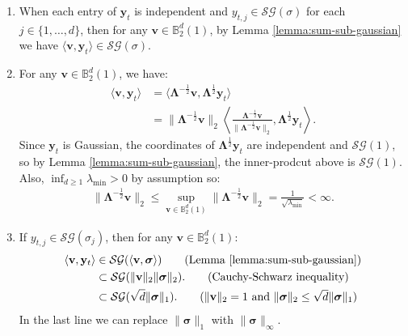 \begin{enumerate}[label=\roman*)]
    \item When each entry of $\mathbf{y}_t$ is independent and $y_{t,j} \in \mathcal{SG}(\sigma)$ for each $j \in \{1, \ldots, d\}$, then for any $\mathbf{v} \in \mathbb{B}^d_2(1)$, by Lemma \ref{lemma:sum-sub-gaussian} we have $\langle \mathbf{v}, \mathbf{y}_t \rangle \in \mathcal{SG}(\sigma)$.
    \item For any $\mathbf{v} \in \mathbb{B}^d_2(1)$, we have:
    \begin{align*}
        \langle \mathbf{v}, \mathbf{y}_t \rangle &= \langle \boldsymbol{\Lambda}^{-\frac{1}{2}}\mathbf{v}, \boldsymbol{\Lambda}^{\frac{1}{2}}\mathbf{y}_t \rangle \\
        &= \lVert\boldsymbol{\Lambda}^{-\frac{1}{2}}\mathbf{v}\rVert_{2} \left\langle \frac{\boldsymbol{\Lambda}^{-\frac{1}{2}}\mathbf{v}}{\lVert\boldsymbol{\Lambda}^{-\frac{1}{2}}\mathbf{v}\rVert_{2}}, \boldsymbol{\Lambda}^{\frac{1}{2}}\mathbf{y}_t \right\rangle.
    \end{align*}
    Since $\mathbf{y}_t$ is Gaussian, the coordinates of $\boldsymbol{\Lambda}^{\frac{1}{2}}\mathbf{y}_t$ are independent and $\mathcal{SG}(1)$, so by Lemma \ref{lemma:sum-sub-gaussian}, the inner-prodcut above is $\mathcal{SG}(1)$. Also, $\inf_{d\geq 1}  \lambda_{\min} > 0$ by assumption so:
    \begin{align*}
        \lVert\boldsymbol{\Lambda}^{-\frac{1}{2}}\mathbf{v}\rVert_{2} \leq \sup_{\mathbf{v} \in \mathbb{B}^d_2(1)} \lVert\boldsymbol{\Lambda}^{-\frac{1}{2}}\mathbf{v}\rVert_{2} = \frac{1}{\sqrt{\lambda_{\min}}} < \infty.
    \end{align*}
    \item If $y_{t,j} \in \mathcal{SG}(\sigma_j)$, then for any $\mathbf{v} \in \mathbb{B}^d_2(1)$: 
    \begin{align*}
        \langle \mathbf{v}, \mathbf{y}_t \rangle &\in \mathcal{SG}(\langle \mathbf{v}, \boldsymbol{\sigma} \rangle) \tag{Lemma \ref{lemma:sum-sub-gaussian}}\\
        &\subset \mathcal{SG}(\lVert\mathbf{v}\rVert_2 \lVert\boldsymbol{\sigma}\rVert_2). \tag{Cauchy-Schwarz inequality} \\
        &\subset \mathcal{SG}(\sqrt{d} \lVert \boldsymbol{\sigma}\rVert_1). \tag{$\lVert \mathbf{v}\rVert_2 = 1$ and $\lVert \boldsymbol{\sigma}\rVert_2 \leq \sqrt{d} \lVert \boldsymbol{\sigma}\rVert_1 $}
    \end{align*}    
    In the last line we can replace $\lVert \boldsymbol{\sigma}\rVert_1$ with $\lVert \boldsymbol{\sigma}\rVert_\infty$.
\end{enumerate}


